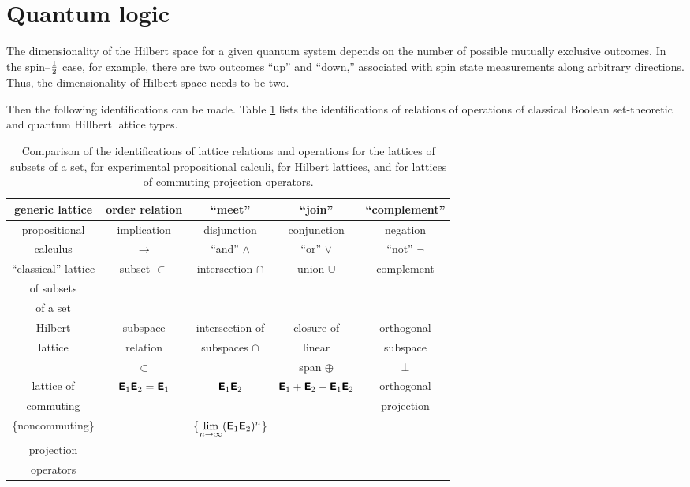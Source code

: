 {\section{Quantum logic}

The dimensionality of the Hilbert space for a given quantum system
depends on the number of possible mutually exclusive outcomes.
In the spin--${1\over 2}$ case, for example, there are two outcomes
``up'' and ``down,'' associated with spin state measurements along arbitrary directions.
Thus, the dimensionality of Hilbert space needs to be two.

Then the following identifications can be made.
Table
 \ref{tcompa} lists the identifications of relations of operations of
classical Boolean set-theoretic and quantum Hillbert lattice types.
\begin{table}
\begin{center}
{\footnotesize
 \begin{tabular}{|ccccc|} \hline\hline
 generic lattice  &  order relation   & ``meet''
&
``join''  & ``complement''\\
\hline
propositional&implication&disjunction&conjunction&negation\\
calculus&$\rightarrow$&``and'' $\wedge$&``or'' $\vee$&``not'' $\neg$\\
\hline
``classical'' lattice  &  subset $\subset $  & intersection $\cap$ &
union
$\cup$ & complement\\
of subsets&&&&\\
of a set&&&&\\
\hline
Hilbert & subspace& intersection of & closure of     & orthogonal \\
lattice & relation& subspaces $\cap$&  linear& subspace   \\
        & $\subset$ &                 & span $\oplus$  &  $\perp$   \\
\hline
lattice of& $\textsf{\textbf{E}}_1\textsf{\textbf{E}}_2=\textsf{\textbf{E}}_1$& $\textsf{\textbf{E}}_1\textsf{\textbf{E}}_2$& $\textsf{\textbf{E}}_1+\textsf{\textbf{E}}_2-\textsf{\textbf{E}}_1\textsf{\textbf{E}}_2$& orthogonal\\
commuting&&&&projection\\
\{noncommuting\}&&\{$\displaystyle\lim_{n\rightarrow \infty}(\textsf{\textbf{E}}_1\textsf{\textbf{E}}_2)^n$\}&&\\
projection&&&&\\
operators&&&&\\
 \hline\hline
 \end{tabular}
}
 \caption{Comparison of the identifications of lattice relations and
 operations for the lattices of subsets of a set, for
 experimental propositional calculi, for  Hilbert lattices, and for
lattices of commuting projection operators.
 \label{tcompa}}
 \end{center}
\end{table}


}
